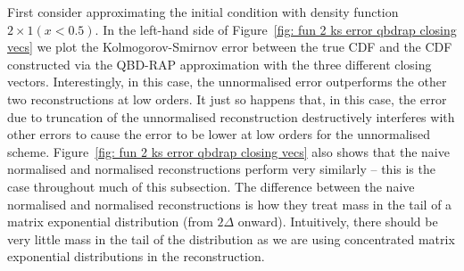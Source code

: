 \begin{example}\label{ex: another example}
	First consider approximating the initial condition with density function \(2\times 1(x<0.5)\). In the left-hand side of Figure~\ref{fig: fun 2 ks error qbdrap closing vecs} we plot the Kolmogorov-Smirnov error between the true CDF and the CDF constructed via the QBD-RAP approximation with the three different closing vectors. Interestingly, in this case, the unnormalised error outperforms the other two reconstructions at low orders. It just so happens that, in this case, the error due to truncation of the unnormalised reconstruction destructively interferes with other errors to cause the error to be lower at low orders for the unnormalised scheme. Figure~\ref{fig: fun 2 ks error qbdrap closing vecs} also shows that the naive normalised and normalised reconstructions perform very similarly -- this is the case throughout much of this subsection. The difference between the naive normalised and normalised reconstructions is how they treat mass in the tail of a matrix exponential distribution (from \(2\Delta\) onward). Intuitively, there should be very little mass in the tail of the distribution as we are using concentrated matrix exponential distributions in the reconstruction. 


\end{example}
